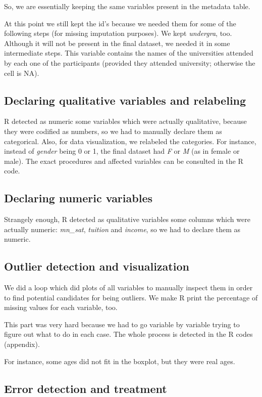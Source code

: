 So, we are essentially keeping the same variables present in the metadata table.

At this point we still kept the id's because we needed them for some of the following steps (for missing imputation purposes). We kept \textit{undergra}, too. Although it will not be present in the final dataset, we needed it in some intermediate steps. This variable contains the names of the universities attended by each one of the participants (provided they attended university; otherwise the cell is NA).

\subsection{Declaring qualitative variables and relabeling}

R detected as numeric some variables which were actually qualitative, because they were codified as numbers, so we had to manually declare them as categorical. Also, for data visualization, we relabeled the categories. For instance, instead of \textit{gender} being 0 or 1, the final dataset had \textit{F} or  \textit{M} (as in female or male). The exact procedures and affected variables can be consulted in the R code.

\subsection{Declaring numeric variables}
Strangely enough, R detected as qualitative variables some columns which were actually numeric: \textit{mn\_sat}, \textit{tuition} and \textit{income}, so we had to declare them as numeric.

\subsection{Outlier detection and visualization}

We did a loop which did plots of all variables to manually inspect them in order to find potential candidates for being outliers. We make R print the percentage of missing values for each variable, too.

This part was very hard because we had to go variable by variable trying to figure out what to do in each case. The whole process is detected in the R codes (appendix).

For instance, some ages did not fit in the boxplot, but they were real ages.


\subsection{Error detection and treatment}

